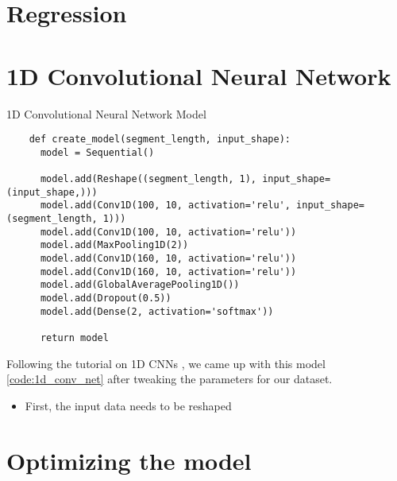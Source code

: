 \section{Regression}

\section{1D Convolutional Neural Network}

\begin{code}
  \caption{1D Convolutional Neural Network Model}
  \label{code:1d_conv_net}
  
  \begin{verbatim}
    def create_model(segment_length, input_shape):
      model = Sequential()

      model.add(Reshape((segment_length, 1), input_shape=(input_shape,))) 
      model.add(Conv1D(100, 10, activation='relu', input_shape=(segment_length, 1)))
      model.add(Conv1D(100, 10, activation='relu'))
      model.add(MaxPooling1D(2))
      model.add(Conv1D(160, 10, activation='relu'))
      model.add(Conv1D(160, 10, activation='relu'))
      model.add(GlobalAveragePooling1D())
      model.add(Dropout(0.5))
      model.add(Dense(2, activation='softmax'))

      return model
  \end{verbatim}
\end{code}

Following the tutorial on 1D CNNs \cite{1d_cnn}, we came up with this model \ref{code:1d_conv_net} after tweaking the parameters for our dataset.
 
\begin{itemize}
  \item First, the input data needs to be reshaped
\end{itemize}
\section{Optimizing the model}